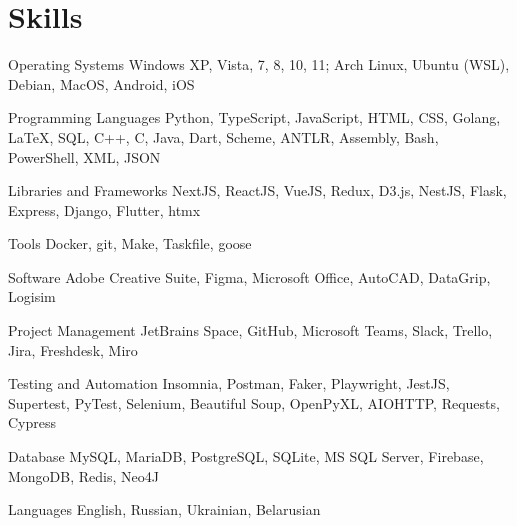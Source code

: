 \section{Skills}

\cvitem
    {Operating Systems}
    {%
        Windows XP, Vista, 7, 8, 10, 11; Arch Linux, Ubuntu (WSL), Debian,
        MacOS, Android, iOS%
    }

\cvitem
    {Programming Languages}
    {%
        Python, TypeScript, JavaScript, HTML, CSS, Golang, \LaTeX, SQL,
        C++, C, Java, Dart, Scheme, ANTLR, Assembly, Bash, PowerShell, XML,
        JSON%
    }

\cvitem
    {Libraries and Frameworks}
    {%
        NextJS, ReactJS, VueJS, Redux, D3.js, NestJS, Flask, Express, Django,
        Flutter, htmx%
    }

\cvitem
    {Tools}
    {%
        Docker, git, Make, Taskfile, goose%
    }

\cvitem
    {Software}
    {%
        Adobe Creative Suite, Figma, Microsoft Office, AutoCAD, DataGrip,
        Logisim%
    }

\cvitem
    {Project Management}
    {%
        JetBrains Space, GitHub, Microsoft Teams, Slack, Trello, Jira,
        Freshdesk, Miro%
    }

\cvitem
    {Testing and Automation}
    {%
        Insomnia, Postman, Faker, Playwright, JestJS, Supertest, PyTest,
        Selenium, Beautiful Soup, OpenPyXL, AIOHTTP, Requests, Cypress%
    }

\cvitem
    {Database}
    {%
        MySQL, MariaDB, PostgreSQL, SQLite, MS SQL Server, Firebase,
        MongoDB, Redis, Neo4J%
    }

\cvitem
    {Languages}
    {English, Russian, Ukrainian, Belarusian}